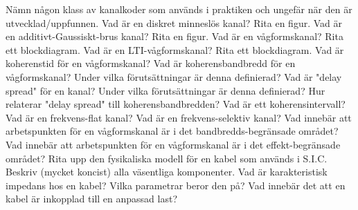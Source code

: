 \documentclass[a4paper,11pt]{article}
\begin{document}
Nämn någon klass av kanalkoder som används i praktiken och ungefär när den är 
utvecklad/uppfunnen.
\newline
\newline
Vad är en diskret minneslös kanal? Rita en figur.
\newline
\newline
Vad är en additivt-Gaussiskt-brus kanal? Rita en figur.
\newline
\newline
Vad är en vågformskanal? Rita ett blockdiagram.
\newline
\newline
Vad är en LTI-vågformskanal?  Rita ett blockdiagram.
\newline
\newline
Vad är koherenstid för en vågformskanal?
\newline
\newline
Vad är koherensbandbredd för en vågformskanal? Under vilka förutsättningar är denna 
definierad?
\newline
\newline
Vad är "delay spread" för en kanal? Under vilka förutsättningar är denna definierad? Hur 
relaterar "delay spread" till koherensbandbredden?
\newline
\newline
Vad är ett koherensintervall?
\newline
\newline
Vad är en frekvens-flat kanal? 
\newline
\newline
Vad är en frekvens-selektiv kanal?
\newline
\newline
Vad innebär att arbetspunkten för en vågformskanal är i det bandbredds-begränsade 
området?
\newline
\newline
Vad innebär att arbetspunkten för en vågformskanal är i det effekt-begränsade området?
\newline
\newline
Rita upp den fysikaliska modell för en kabel som används i S.I.C.  Beskriv (mycket koncist) 
alla väsentliga komponenter.
\newline
\newline
Vad är karakteristisk impedans hos en kabel?  Vilka parametrar beror den på? 
\newline
\newline
Vad innebär det att en kabel är inkopplad till en anpassad last?
\newline
\end{document}
